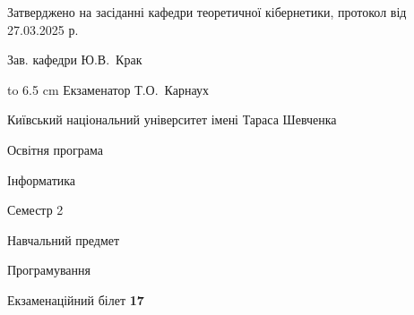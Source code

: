 \documentclass[12pt, ukrainian]{article}
\begin{document}
{\smallskip\smallskip \begin {scriptsize} Затверджено на засіданні кафедри теоретичної кібернетики, протокол   від   27.03.2025 р.\par\smallskip\smallskip\smallskip\smallskip
{\parbox {6.5 cm} {Зав. кафедри \dotfill Ю.В.~Крак}}\hspace {0.7cm} {\hbox to 6.5 cm { Екзаменатор \dotfill Т.О.~Карнаух}} \end{scriptsize}}
\newpage
{{\begin {scriptsize}\par
{ \center  Київський національний університет імені Тараса Шевченка \par}
{\parbox {5 cm}{Освітня програма \hfill}{\parbox {7 cm}{Інформатика\hfill}}\parbox {6 cm}{\hfill Семестр 2}}\par
{\parbox {5 cm} {Навчальний предмет \hfill}\parbox {7 cm}{Програмування \hfill}\parbox {6cm}{\hfill}\par}\vspace{-15pt} \end{scriptsize}}{\center Екзаменаційний білет \No \textbf { 17 }\par}}
\end{document}
